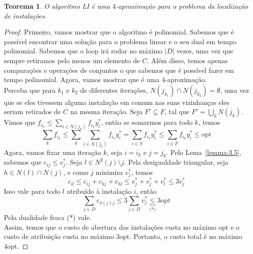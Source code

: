 \documentclass[12pt]{article}
\newcommand{\opt}{\ensuremath{\mathrm{opt}}}
\newtheorem{theorem}{Teorema}[section]
\begin{document}
\begin{theorem}
    O algoritmo {\sc LI} é uma $4$-aproximação para o problema da localização de instalações.
\end{theorem}
\begin{proof}
    Primeiro, vamos mostrar que o algoritmo é polinomial. Sabemos que é possível encontrar uma solução para o problema linear e o seu dual em tempo polinomial. Sabemos que o loop irá rodar no máximo $|D|$ vezes, uma vez que sempre retiramos pelo menos um elemento de $C$. Além disso, temos apenas comparações e operações de conjuntos o que sabemos que é possível fazer em tempo polinomial.
    Agora, vamos mostrar que é uma $4$-aproximação.\\
    Perceba que para $k_1$ e $k_2$ de diferentes iterações, $N(j_{k_1})\cap N(j_{k_2}) = \emptyset$, uma vez que se eles tivessem alguma instalação em comum nas suas vizinhanças eles seriam retirados de $C$ na mesma iteração. Seja $F' \subseteq F$, tal que $F' = \bigcup_k N(j_k)$. \\
    Vimos que $f_{i_k} \leq \sum_{i \in N(j_k)}f_{i_k}y^*_{i}$, então se somarmos para todo $k$, temos
    \[ \sum_kf_{i_k} \leq \sum_k \sum_{i \in N(j_k)}f_{i_k}y^*_{i} = \sum_{i \in S}f_{i_k}y^*_{i} \leq \sum_{i \in F}f_{i_k}y^*_{i} \leq \opt\]
    Agora, vamos fixar uma iteração $k$, seja $i = i_k$ e $j = j_k$. Pelo Lema~\ref{lemma:3.5}, sabemos que $c_{ij} \leq v^*_j$. Seja $l \in N^2(j) \setminus j$. Pela desigualdade triangular, seja $h \in N(l) \cap N(j)$, e como $j$ minimiza $v^*_j$, temos
    \[ c_{il} \leq c_{ij} + c_{hj} + c_{hl} \leq v_j^* + v_j^* + v_l^* \leq 3 v_j^*
        \]
    Isso vale para todo $l$ atribuído à instalação $i$, então
    \[\sum_{j\in D} c_{\sigma(j)j} \leq 3 \sum_{j \in D} v^*_j \underbrace{\leq}_{\text{(*)}} 3\opt\]
    Pela dualidade fraca (*) vale. \\
    Assim, temos que o custo de abertura das instalações custa no máximo $\opt$ e o custo de atribuição custa no máximo $3\opt$. Portanto, o custo total é no máximo $4\opt$.
\end{proof}
\newpage



\end{document}
